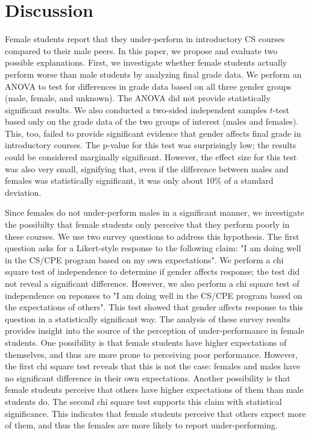 \documentclass[a4paper,man,natbib]{apa6}
\begin{document}
\section{Discussion}
Female students report that they under-perform in introductory CS courses
compared to their male peers. In this paper, we propose and evaluate two
possible explanations. First, we investigate whether female students actually
perform worse than male students by analyzing final grade data. We perform an
ANOVA to test for differences in grade data based on all three gender groups
(male, female, and unknown). The ANOVA did not provide statistically
significant results. We also conducted a two-sided independent samples $t$-test
based only on the grade data of the two groups of interest (males and females).
This, too, failed to provide significant evidence that gender affects final
grade in introductory courses. The p-value for this test was surprisingly low;
the results could be considered marginally significant. However, the effect
size for this test was also very small, signifying that, even if the difference
between males and females was statistically significant, it was only about 10\%
of a standard deviation.

Since females do not under-perform males in a significant manner, we
investigate the possibilty that female students only perceive that they perform
poorly in these courses. We use two survey questions to address this
hypothesis. The first question asks for a Likert-style response to the
following claim: "I am doing well in the CS/CPE program based on my own
expectations". We perform a chi square test of independence to determine if
gender affects response; the test did not reveal a significant difference.
However, we also perform a chi square test of independence on reponses to "I am
doing well in the CS/CPE program based on the expectations of others". This
test showed that gender affects response to this question in a statistically
significant way. The analysis of these survey results provides insight into the
source of the perception of under-performance in female students. One
possibility is that female students have higher expectations of themselves, and
thus are more prone to perceiving poor performance. However, the first chi
square test reveals that this is not the case: females and males have no
significant difference in their own expectations. Another possibility is that
female students perceive that others have higher expectations of them than male
students do. The second chi square test supports this claim with statistical
significance. This indicates that female students perceive that others expect more of
them, and thus the females are more likely to report under-performing.
\end{document}
